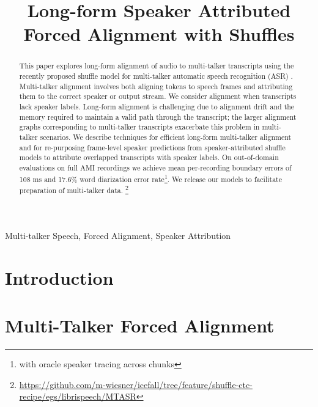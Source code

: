 \documentclass{article}
\title{Long-form Speaker Attributed Forced Alignment with Shuffles}
\begin{document}
\ninept

\maketitle

\begin{abstract}
This paper explores long-form alignment of audio to multi-talker transcripts using the recently proposed shuffle model for multi-talker automatic speech recognition (ASR) \cite{wiesner2026modeling}. Multi-talker alignment involves both aligning tokens to speech frames and attributing them to the correct speaker or output stream. We consider alignment when transcripts lack speaker labels. Long-form alignment is challenging due to alignment drift and the memory required to maintain a valid path through the transcript; the larger alignment graphs corresponding to multi-talker transcripts exacerbate this problem in multi-talker scenarios. We describe techniques for efficient long-form multi-talker alignment and for re-purposing frame-level speaker predictions from speaker-attributed shuffle models to attribute overlapped transcripts with speaker labels. On out-of-domain evaluations on full AMI recordings we achieve mean per-recording boundary errors of 108 ms and 17.6\% word diarization error rate\footnote{with oracle speaker tracing across chunks}. We release our models to facilitate preparation of multi-talker data. \footnote{\url{https://github.com/m-wiesner/icefall/tree/feature/shuffle-ctc-recipe/egs/librispeech/MTASR}}
\end{abstract}
%
\begin{keywords}
Multi-talker Speech, Forced Alignment, Speaker Attribution
\end{keywords}

\section{Introduction}

%
%

%
\vspace{-2mm}
\section{Multi-Talker Forced Alignment}


\end{document}
